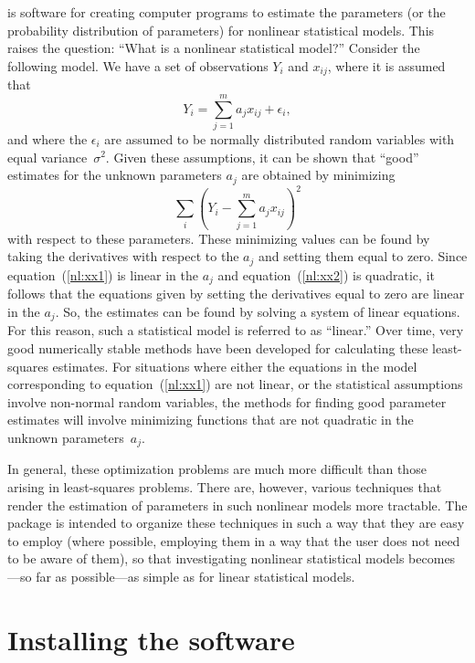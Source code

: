 \documentclass{admbmanual}
\begin{document}
\ADMS is software for creating computer programs to estimate the parameters (or
the probability distribution of parameters) for nonlinear statistical models.
This raises the question: ``What is a nonlinear statistical model?'' Consider
the following model. We have a set of observations $Y_i$ and $x_{ij}$, where it
is assumed that
\begin{equation}
{Y_i=\sum_{j=1}^m a_j x_{ij}+\epsilon_i}\label{nl:xx1},
\end{equation}
and where the $\epsilon_i$ are assumed to be normally distributed random
variables with equal variance~$\sigma^2$. Given these assumptions, it can be
shown that ``good'' estimates for the unknown parameters $a_j$ are obtained by
minimizing
\begin{equation}
{ \sum_i \left(Y_i-\sum_{j=1}^m a_jx_{ij} \right)^2}\label{nl:xx2}
\end{equation}
with respect to these parameters. These minimizing values can be found by taking
the derivatives with respect to the $a_j$ and setting them equal to zero. Since
equation~(\ref{nl:xx1}) is linear in the $a_j$ and equation~(\ref{nl:xx2}) is
quadratic, it follows that the equations given by setting the derivatives equal
to zero are linear in the $a_j$. So, the estimates can be found by solving a
system of linear equations. For this reason, such a statistical model is
referred to as ``linear.'' Over time, very good numerically stable methods have
been developed for calculating these least-squares estimates. For situations
where either the equations in the model corresponding to equation~(\ref{nl:xx1})
are not linear, or the statistical assumptions involve non-normal random
variables, the methods for finding good parameter estimates will involve
minimizing functions that are not quadratic in the unknown parameters~$a_j$.

In general, these optimization problems are much more difficult than those
arising in least-squares problems. There are, however, various techniques that
render the estimation of parameters in such nonlinear models more tractable. The
\ADMS package is intended to organize these techniques in such a way that they
are easy to employ (where possible, employing them in a way that the user does
not need to be aware of them), so that investigating nonlinear statistical
models becomes---so far as possible---as simple as for linear statistical
models.

\section{Installing the software}
\end{document}
